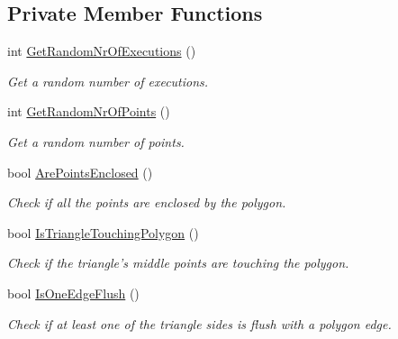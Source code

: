 \subsection*{Private Member Functions}
\begin{DoxyCompactItemize}
\item 
int \hyperlink{classmultiscaletest_1_1MinEnclosingTriangleFinderTest_a840237e49598c5f7b067cdd071cebf9f}{Get\-Random\-Nr\-Of\-Executions} ()
\begin{DoxyCompactList}\small\item\em Get a random number of executions. \end{DoxyCompactList}\item 
int \hyperlink{classmultiscaletest_1_1MinEnclosingTriangleFinderTest_adc8b2cb0bce76d96d3d5c3da008fa87a}{Get\-Random\-Nr\-Of\-Points} ()
\begin{DoxyCompactList}\small\item\em Get a random number of points. \end{DoxyCompactList}\item 
bool \hyperlink{classmultiscaletest_1_1MinEnclosingTriangleFinderTest_a73de7a5f4f5fc4eb72ce68e4a4d793b7}{Are\-Points\-Enclosed} ()
\begin{DoxyCompactList}\small\item\em Check if all the points are enclosed by the polygon. \end{DoxyCompactList}\item 
bool \hyperlink{classmultiscaletest_1_1MinEnclosingTriangleFinderTest_a03d3983c2b6cef870e6e6c8c79c06976}{Is\-Triangle\-Touching\-Polygon} ()
\begin{DoxyCompactList}\small\item\em Check if the triangle's middle points are touching the polygon. \end{DoxyCompactList}\item 
bool \hyperlink{classmultiscaletest_1_1MinEnclosingTriangleFinderTest_a3a9be9bf036777162a594ccc77cb6114}{Is\-One\-Edge\-Flush} ()
\begin{DoxyCompactList}\small\item\em Check if at least one of the triangle sides is flush with a polygon edge. \end{DoxyCompactList}\end{DoxyCompactItemize}
